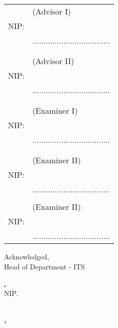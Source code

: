 \noindent
\begin{tabularx}{\textwidth}{X l}
  \advisor{}               & (Advisor I)                         \\
  NIP: \advisornip{}       &                                     \\
                           & ................................... \\
                           &                                     \\
                           &                                     \\
  \coadvisor{}             & (Advisor II)                        \\
  NIP: \coadvisornip{}     &                                     \\
                           & ................................... \\
                           &                                     \\
                           &                                     \\
                           & (Examiner I)                        \\
  NIP:                     &                                     \\
                           & ................................... \\
                           &                                     \\
                           &                                     \\
                           & (Examiner II)                       \\
  NIP:                     &                                     \\
                           & ................................... \\
                           &                                     \\
                           & (Examiner II)                       \\
  NIP:                     &                                     \\
                           & ................................... \\
\end{tabularx}
\endgroup

\begin{center}
  Acknowledged, \\
  Head of \engdepartment{} Department \engfacultyshort{} - ITS \\
  
  \vspace{8ex}
  
  \underline{\headofdepartment{}.} \\
  NIP. \headofdepartmentnip{}
\end{center}

\begin{center}
  \textbf{\MakeUppercase{\place{}}\\\ENGMONTH{}, \the\year{}}
\end{center}
\endgroup